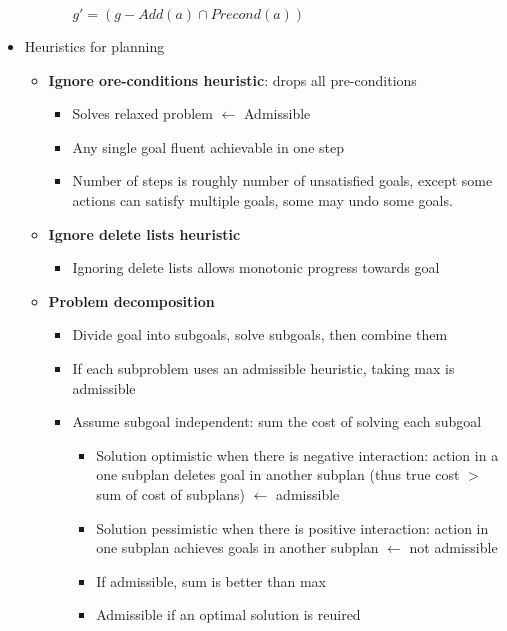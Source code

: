 \documentclass[12pt]{article}
\begin{document}
\begin{itemize}
\begin{itemize}
\begin{itemize}
$g' = (g - Add(a) \cap Precond(a))$
\end{itemize}
\end{itemize}
\item Heuristics for planning 
\begin{itemize}
\item \textbf{Ignore ore-conditions heuristic}: drops all pre-conditions
\begin{itemize}
\item Solves relaxed problem $\gets$ Admissible
\item Any single goal fluent achievable in one step
\item Number of steps is roughly number of unsatisfied  goals, except some actions can satisfy multiple goals, some may undo some goals.
\end{itemize}
\item \textbf{Ignore delete lists heuristic}
\begin{itemize}
\item Ignoring delete lists allows monotonic progress towards goal
\end{itemize}
\item \textbf{Problem decomposition}
\begin{itemize}
\item Divide goal into subgoals, solve subgoals, then combine them
\item If each subproblem uses an admissible heuristic, taking max is admissible
\item Assume subgoal independent: sum the cost of solving each subgoal 
\begin{itemize}
\item Solution optimistic when there is negative interaction: action in a one subplan deletes goal in another subplan (thus true cost $>$ sum of cost of subplans) $\gets$ admissible
\item Solution pessimistic when there is positive interaction: action in one subplan achieves goals in another subplan $\gets$ not admissible
\item If admissible, sum is better than max 
\item Admissible if an optimal solution is reuired
\end{itemize}

\end{itemize}
\end{itemize}
\end{itemize}
\end{document}
